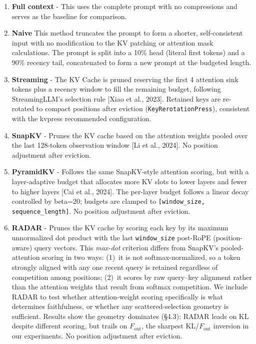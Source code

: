 \documentclass[10pt,letterpaper]{article}
\begin{document}
\begin{enumerate}
\item 
\textbf{Full context} - This uses the 
complete prompt with no compressions and serves as the baseline for comparison.

\item
\textbf{Naive} This method truncates the prompt
to form a shorter, self-consistent input with no modification to the KV patching or
attention mask calculations. The prompt is split into a 10\% head (literal first tokens)
and a 90\% recency tail, concatenated to form a new prompt at the budgeted length.

\item
\textbf{Streaming} - The KV Cache is pruned reserving the first 4 attention sink tokens plus a
recency window to fill the remaining budget, following StreamingLLM’s selection rule [Xiao et
al., 2023]. Retained keys are re-rotated to compact positions after eviction
(\texttt{KeyRerotationPress}), consistent with the kvpress recommended configuration.

\item
\textbf{SnapKV} - Prunes the KV cache based on the attention weights pooled over the last 128-token
observation window {[}Li et al., 2024{]}. No position adjustment after eviction.

\item
\textbf{PyramidKV} - Follows the same SnapKV-style attention scoring, but with a layer-adaptive
budget that allocates more KV slots to lower layers and fewer to higher layers [Cai et al., 2024].
The per-layer budget follows a linear decay controlled by beta=20; budgets are clamped to
\texttt{[window\_size, sequence\_length]}. No position adjustment after eviction.

\item
\textbf{RADAR} - Prunes the KV cache by scoring each key by its maximum
unnormalized dot product with the last \texttt{window\_size} post-RoPE (position-aware)
query vectors. This \emph{max-dot} criterion differs from SnapKV's pooled-attention
scoring in two ways: (1)~it is not softmax-normalized, so a token strongly aligned
with any one recent query is retained regardless of competition among positions;
(2)~it scores by raw query--key alignment rather than the attention weights that
result from softmax competition. We include RADAR to test whether attention-weight
scoring specifically is what determines faithfulness, or whether any scattered-selection
geometry is sufficient. Results show the geometry dominates (§4.3): RADAR leads on
KL despite different scoring, but trails on $F_{\text{out}}$, the sharpest
KL/$F_{\text{out}}$ inversion in our experiments. No position adjustment after eviction.

\end{enumerate}
\end{document}
